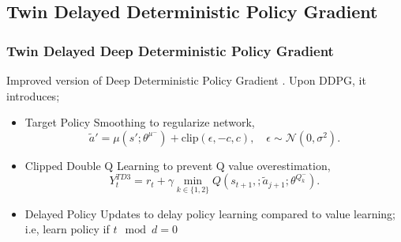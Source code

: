 \documentclass{beamer}
\begin{document}
\subsection{Twin Delayed Deterministic Policy Gradient}
\begin{frame}
\frametitle{Twin Delayed Deep Deterministic Policy Gradient}
Improved version of Deep Deterministic Policy Gradient \cite{fujimoto_addressing_2018}.
Upon DDPG, it introduces;
\begin{itemize}
	\item Target Policy Smoothing to regularize network,
	\begin{equation}
	\label{eqn:td3_target_action}
	\widetilde{a}' = \mu(s';\theta^{\mu^-}) + \text{clip}(\epsilon, -c, c), \quad \epsilon \sim \mathcal{N}(0, \sigma^2).
	\end{equation}
	\item Clipped Double Q Learning to prevent Q value overestimation,
	\begin{equation}
	\label{eqn:td3_target}
	Y_t^{TD3} = r_t + \gamma \min_{k\in\{1,2\}} Q(s_{t+1}, ;\widetilde{a}_{j+1};\theta^{Q_k^-}).
	\end{equation}
	\item Delayed Policy Updates to delay policy learning compared to value learning; i.e, learn policy if $t\mod d = 0$
\end{itemize}
\end{frame}
\end{document}
